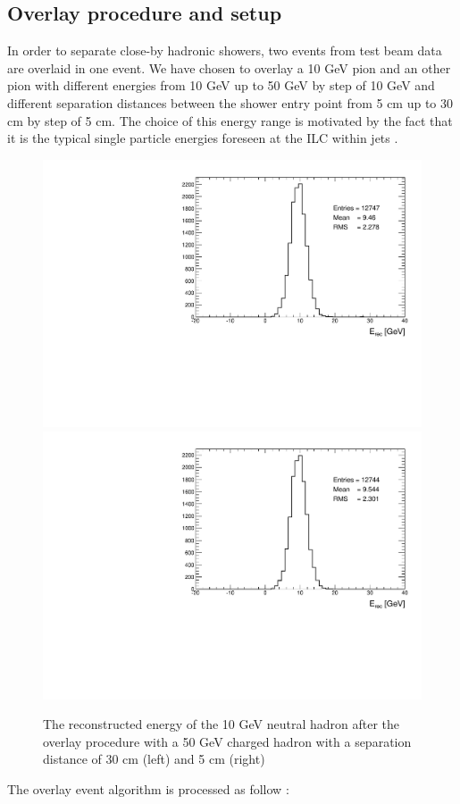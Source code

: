 \documentclass[cits]{JINST}
\begin{document}
\subsection{Overlay procedure and setup}

In order to separate close-by hadronic showers, two events from test beam data are overlaid in one event. We have chosen to overlay a 10 GeV pion and an other pion with different energies from 10 GeV up to 50 GeV by step of 10 GeV and different separation distances between the shower entry point from 5 cm up to 30 cm by step of 5 cm. The choice of this energy range is motivated by the fact that it is the typical single particle energies foreseen at the ILC within jets \cite{ilc-tdr}. 

\begin{figure}[!h]
  \begin{center}
    \includegraphics[width=0.47\linewidth]{plots/histo_neutral_mcenergy_ArborPFA_TestBeam_10GeV_n_50GeV_ch_30_cm.pdf}
    \includegraphics[width=0.47\linewidth]{plots/histo_neutral_mcenergy_ArborPFA_TestBeam_10GeV_n_50GeV_ch_5_cm.pdf}
  \end{center}
  \caption{\label{OVERLAY_EVENT_MC_EREC_OVERLAID_HITS} The reconstructed energy of the 10 GeV neutral hadron after the overlay procedure with a 50 GeV charged hadron with a separation distance of 30 cm (left) and 5 cm (right)}
\end{figure}

The overlay event algorithm is processed as follow :
\end{document}
